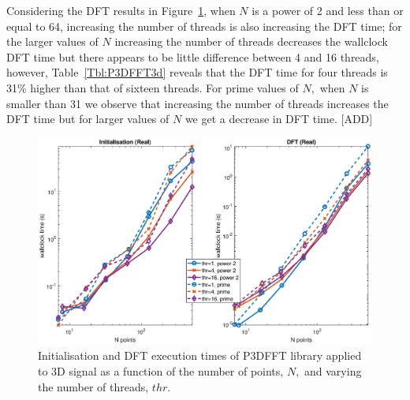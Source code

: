 \documentclass[a4paper]{article}
\begin{document}
Considering the DFT results in Figure~\ref{3DP3DFFT}, when $N$ is a
power of 2 and less than or equal to 64, increasing the number of
threads is also increasing the DFT time; for the larger values of $N$
increasing the number of threads decreases the wallclock DFT time but
there appears to be little difference between 4 and 16 threads,
however, Table~\ref{Tbl:P3DFFT3d} reveals that the DFT time for four
threads is 31\% higher than that of sixteen threads. For prime values
of $N,$ when $N$ is smaller than 31 we observe that increasing the
number of threads increases the DFT time but for larger values of $N$
we get a decrease in DFT time. [ADD]



\begin{figure}[htb]
    \centering
    \includegraphics[width=\linewidth]{../results/p3dfft_3d_thr.eps}
  \caption{Initialisation and DFT execution times of P3DFFT library applied to 3D signal as a function of the
    number of points, $N,$ and varying the number of threads, $thr.$ }
  \label{3DP3DFFT}
\end{figure}
\end{document}

